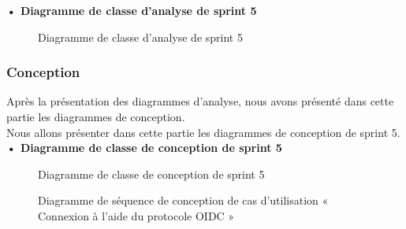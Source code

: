 \textbf{•	Diagramme de classe d'analyse de sprint 5 }


\begin{figure}[H]
  \centering
  \caption{Diagramme de classe d'analyse de sprint 5}
  \label{fig:class_analyse_sprint5}
\end{figure}


\subsubsection{Conception}

Après la présentation des diagrammes d'analyse, nous avons présenté dans cette partie les diagrammes de conception.\\ 
Nous allons présenter dans cette partie les diagrammes de conception de sprint 5. \\
\textbf{•	Diagramme de classe de conception de sprint 5}

\begin{figure}[H]
  \centering
  \caption{Diagramme de classe de conception de sprint 5}
  \label{fig:class_diagram_51}
\end{figure}


\begin{figure}[H]
  \centering
  \caption{Diagramme de séquence de conception de cas d'utilisation « Connexion à l'aide du protocole OIDC »}
  \label{fig:sequence_conception_auth_OIDC}
\end{figure}

